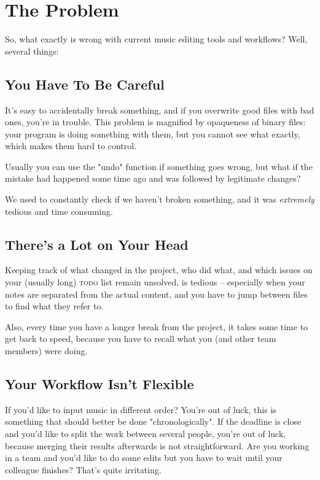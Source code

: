 \documentclass[11pt,a4paper]{article}
\begin{document}
\section{The Problem}
So, what exactly is wrong with current music editing tools and workflows?
Well, several things:

\subsection{You Have To Be Careful}
It's easy to accidentally break something, and if you overwrite good files
with bad ones, you're in trouble.  This problem is magnified by opaqueness
of binary files: your program is doing something with them,
but you cannot see what exactly, which makes them hard to control.

Usually you can use the "undo" function if something goes wrong,
but what if the mistake had happened some time ago and was followed by legitimate changes?

We used to constantly check if we haven't broken something,
and it was \emph{extremely} tedious and time consuming.

\subsection{There's a Lot on Your Head}
Keeping track of what changed in the project, who did what,
and which issues on your (usually long) \textsc{todo} list remain
unsolved, is tedious -- especially when your notes are separated from
the actual content, and you have to jump between files to find
what they refer to.

Also, every time you have a longer break from the project, it takes some
time to get back to speed, because you have to recall what you
(and other team members) were doing.

\subsection{Your Workflow Isn't Flexible}
If you'd like to input music in different order?  You're out of luck,
this is something that should better be done "chronologically".
If the deadline is close and you'd like to split the work between several people,
you're out of luck, because merging their results afterwards is not straightforward.
Are you working in a team and you'd like to do some edits but you have to wait
until your colleague finishes?  That's quite irritating.
\end{document}

